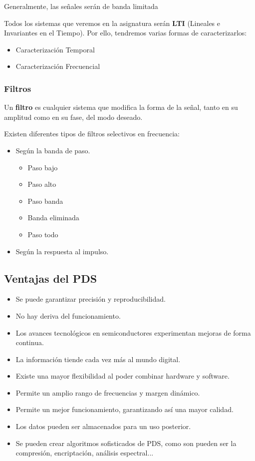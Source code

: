 \documentclass[a4paper]{book}
\begin{document}
Generalmente, las señales serán de banda limitada

Todos los sistemas que veremos en la asignatura serán \textbf{LTI} (Lineales e Invariantes en el Tiempo). Por ello, tendremos varias formas de caracterizarlos:
\begin{itemize}
	 \item Caracterización Temporal
	 \item Caracterización Frecuencial
\end{itemize}

\subsubsection{Filtros}

Un \textbf{filtro} es cualquier sistema que modifica la forma de la señal, tanto en su amplitud como en su fase, del modo deseado.

Existen diferentes tipos de filtros selectivos en frecuencia:
\begin{itemize}
	 \item Según la banda de paso.
	 \begin{itemize}
		  \item Paso bajo
		  \item Paso alto
		  \item Paso banda 
		  \item Banda eliminada 
		  \item Paso todo
	 \end{itemize}
	 \item Según la respuesta al impulso.
\end{itemize}

\subsection{Ventajas del PDS}
\begin{itemize}
	 \item Se puede garantizar precisión y reproducibilidad.
	 \item No hay deriva del funcionamiento.
	 \item Los avances tecnológicos en semiconductores experimentan mejoras de forma continua.
	 \item La información tiende cada vez más al mundo digital.
	 \item Existe una mayor flexibilidad al poder combinar hardware y software.
	 \item Permite un amplio rango de frecuencias y margen dinámico.
	 \item Permite un mejor funcionamiento, garantizando así una mayor calidad.
	 \item Los datos pueden ser almacenados para un uso posterior.
	 \item Se pueden crear algoritmos sofisticados de PDS, como son pueden ser la compresión, encriptación, análisis espectral...
\end{itemize}
\end{document}
